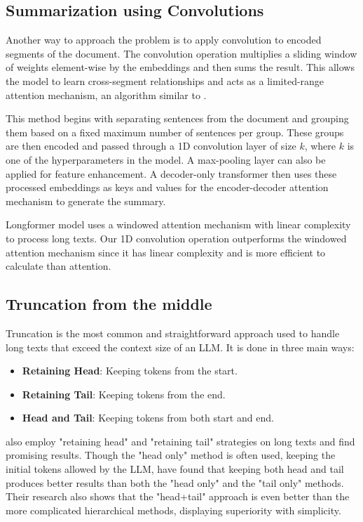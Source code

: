 \subsection{Summarization using Convolutions}

Another way to approach the problem is to apply convolution to encoded segments of
the document.
The convolution operation multiplies a sliding window of weights element-wise by the
embeddings and then sums the result.
This allows the model to learn cross-segment relationships and acts as a
limited-range attention mechanism, an algorithm similar to \citet{chen2022long}.

This method begins with separating sentences from the document and grouping them
based on a fixed maximum number of sentences per group.
These groups are then encoded and passed through a 1D convolution layer of size $k$,
where $k$ is one of the hyperparameters in the model.
A max-pooling layer can also be applied for feature enhancement.
A decoder-only transformer then uses these processed embeddings as keys and values
for the encoder-decoder attention mechanism to generate the summary.

Longformer model \cite{beltagy2020longformer} uses a windowed attention mechanism with
linear complexity to process long texts.
Our 1D convolution operation outperforms the windowed attention mechanism since it has
linear complexity and is more efficient to calculate than attention.


\subsection{Truncation from the middle}

Truncation is the most common and straightforward approach used to handle long texts
that exceed the context size of an LLM.
It is done in three main ways:

\begin{itemize}
	\item \textbf{Retaining Head}: Keeping tokens from the start.
	\item \textbf{Retaining Tail}: Keeping tokens from the end.
	\item \textbf{Head and Tail}: Keeping tokens from both start and end.
\end{itemize}

\citet{worsham-kalita-2018-genre} also employ "retaining head" and "retaining tail"
strategies on long texts and find promising results.
Though the "head only" method is often used, keeping the initial tokens allowed by the
LLM, \citet{sun2019fine} have found that keeping both head and tail produces better
results than both the "head only" and the "tail only" methods.
Their research also shows that the "head+tail" approach is even better than the more
complicated hierarchical methods, displaying superiority with simplicity.
